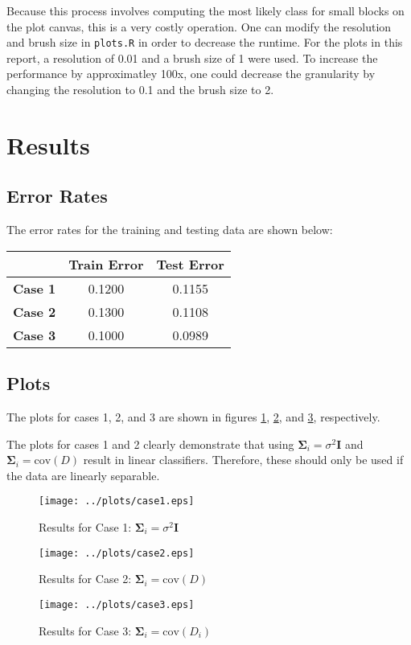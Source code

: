 \documentclass{article}
\begin{document}
Because this process involves computing the most likely class for small
blocks on the plot canvas, this is a very costly operation. One can modify
the resolution and brush size in \verb|plots.R| in order to decrease the
runtime. For the plots in this report, a resolution of 0.01 and a brush 
size of 1 were used. To increase the performance by approximatley 100x,
one could decrease the granularity by changing the resolution to 0.1 and 
the brush size to 2.

\section{Results}

\subsection{Error Rates}

The error rates for the training and testing data are shown below:
\begin{center}
\begin{tabular}{|c|c|c|}
\hline
	& {\bf Train Error } & {\bf Test Error } \\
\hline
\hline
	{\bf Case 1} & 0.1200 & 0.1155 \\
\hline
	{\bf Case 2} & 0.1300 & 0.1108 \\
\hline
	{\bf Case 3} & 0.1000 & 0.0989 \\
\hline
\end{tabular}
\end{center}

\subsection{Plots}

The plots for cases 1, 2, and 3 are shown in figures \ref{fig:case1-scatter},
\ref{fig:case2-scatter}, and \ref{fig:case3-scatter}, respectively.

The plots for cases 1 and 2 clearly demonstrate that using $\mathbf{\Sigma}_i=\sigma^2\mathbf{I}$
and $\mathbf{\Sigma}_i=\mbox{cov}(D)$ result in linear classifiers. Therefore, these should only
be used if the data are linearly separable.

\begin{figure}[thb]
\centering
\label{fig:case1-scatter}
\texttt{[image: ../plots/case1.eps]}
\caption{Results for Case 1: $\mathbf{\Sigma}_i = \sigma^2 \mathbf{I}$}
\end{figure}

\begin{figure}[thb]
\centering
\label{fig:case2-scatter}
\texttt{[image: ../plots/case2.eps]}
\caption{Results for Case 2: $\mathbf{\Sigma}_i = \mbox{cov}(D)$}
\end{figure}

\begin{figure}[thb]
\centering
\label{fig:case3-scatter}
\texttt{[image: ../plots/case3.eps]}
\caption{Results for Case 3: $\mathbf{\Sigma}_i = \mbox{cov}(D_i)$}
\end{figure}
\end{document}
